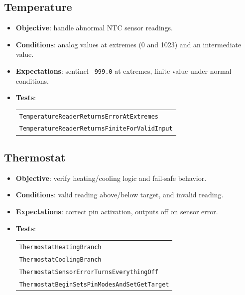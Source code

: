\subsection{Temperature}
\begin{itemize}
  \item \textbf{Objective}: handle abnormal NTC sensor readings.
  \item \textbf{Conditions}: analog values at extremes (0 and 1023) and an intermediate value.
  \item \textbf{Expectations}: sentinel \texttt{-999.0} at extremes, finite value under normal conditions.
  \item \textbf{Tests}:
  \begin{tabular}[t]{@{}l@{}}
    \texttt{TemperatureReaderReturnsErrorAtExtremes}\\
    \texttt{TemperatureReaderReturnsFiniteForValidInput}
  \end{tabular}
\end{itemize}

\subsection{Thermostat}
\begin{itemize}
  \item \textbf{Objective}: verify heating/cooling logic and fail-safe behavior.
  \item \textbf{Conditions}: valid reading above/below target, and invalid reading.
  \item \textbf{Expectations}: correct pin activation, outputs off on sensor error.
  \item \textbf{Tests}:
  \begin{tabular}[t]{@{}l@{}}
    \texttt{ThermostatHeatingBranch}\\
    \texttt{ThermostatCoolingBranch}\\
    \texttt{ThermostatSensorErrorTurnsEverythingOff}\\
    \texttt{ThermostatBeginSetsPinModesAndSetGetTarget}
  \end{tabular}
\end{itemize}

